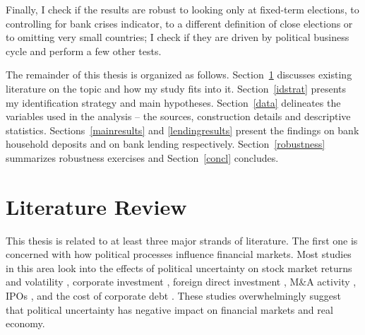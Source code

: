 \documentclass[12pt,a4paper]{article}
\begin{document}
Finally, I check if the results are robust to looking only at fixed-term elections, to controlling for bank crises indicator, to a different definition of close elections or to omitting very small countries; I check if they are driven by political business cycle and perform a few other tests.

The remainder of this thesis is organized as follows. Section~\ref{litrew} discusses existing literature on the topic and how my study fits into it. Section~\ref{idstrat} presents my identification strategy and main hypotheses. Section~\ref{data} delineates the variables used in the analysis -- the sources, construction details and descriptive statistics. Sections~\ref{mainresults} and \ref{lendingresults} present the findings on bank household deposits and on bank lending respectively. Section~\ref{robustness} summarizes robustness exercises and Section~\ref{concl} concludes.


\section{Literature Review}\label{litrew}
This thesis is related to at least three major strands of literature. The first one is concerned with how political processes influence financial markets. Most studies in this area look into the effects of political uncertainty on stock market returns and volatility \citep{baker2016measuring, li2018national}, corporate investment \citep{julio2012political, baker2016measuring, jens2017political}, foreign direct investment \citep{julio2016policy}, M\&A activity \citep{bonaime2018}, IPOs \citep{ccolak2017political}, and the cost of corporate debt \citep{waisman2015effect}. These studies overwhelmingly suggest that political uncertainty has negative impact on financial markets and real economy.
\end{document}
